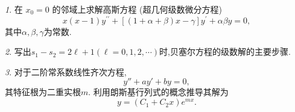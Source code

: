 \documentclass[11pt]{article}
\theoremstyle{remark}
\newtheorem{problem}{}
\begin{document}
\renewcommand{\labelenumi}{(\arabic{enumi})}
\renewcommand{\labelenumii}{(\arabic{enumi}.\arabic{enumii})}

\begin{problem}
  在 $x_0=0$ 的邻域上求解高斯方程 (超几何级数微分方程) 
  $$x(x-1) y^{\prime \prime}+[(1+\alpha+\beta) x-\gamma] y^{\prime}+\alpha \beta y=0,$$
  其中$\alpha, \beta, \gamma$为常数.
\end{problem}

\vspace{4em}

\begin{problem}
写出$s_1 - s_2 = 2\ell + 1(\ell = 0, 1, 2, \cdots)$时,贝塞尔方程的级数解的主要步骤.
\end{problem}
  
\vspace{4em}

\begin{problem}
对于二阶常系数线性齐次方程, $$
y'' + a y' + by = 0,
$$
其特征根为二重实根$m$.
利用朗斯基行列式的概念推导其解为 
\begin{equation*}
    y = (C_1 + C_2  x) e^{m x}.
\end{equation*}
\end{problem}




\end{document}
